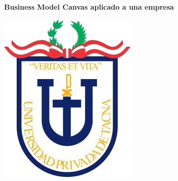 \documentclass[10pt,a4paper]{article}
\begin{document}
		
		\begin{center}
			\huge \textbf{Business Model Canvas aplicado a una empresa} 
		\end{center}
		\vspace{\baselineskip}
		\begin{center}
			\includegraphics[scale=0.37]{./Imagenes/logo}
		\end{center}
\end{document}
